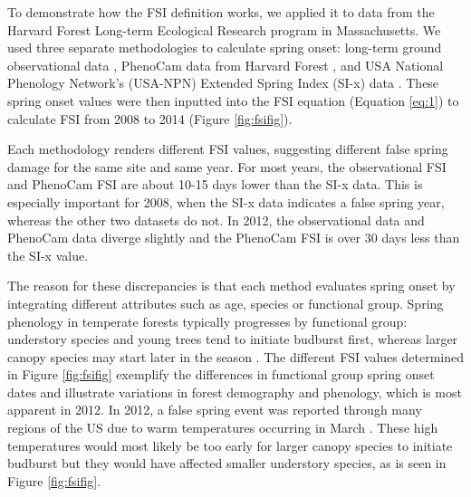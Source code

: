 \documentclass{article}\usepackage[]{graphicx}\usepackage[]{color}
\begin{document}
To demonstrate how the FSI definition works, we applied it to data from the Harvard Forest Long-term Ecological Research program in Massachusetts. We used three separate methodologies to calculate spring onset: long-term ground observational data \citep{Okeefe2014}, PhenoCam data from Harvard Forest \citep{Richardson2015}, and USA National Phenology Network's (USA-NPN) Extended Spring Index (SI-x) data \citep{USA-NPN2016}. These spring onset values were then inputted into the FSI equation (Equation \ref{eq:1}) to calculate FSI from 2008 to 2014 (Figure \ref{fig:fsifig}). 

Each methodology renders different FSI values, suggesting different false spring damage for the same site and same year. For most years, the observational FSI and PhenoCam FSI are about 10-15 days lower than the SI-x data. This is especially important for 2008, when the SI-x data indicates a false spring year, whereas the other two datasets do not. In 2012, the observational data and PhenoCam data diverge slightly and the PhenoCam FSI is over 30 days less than the SI-x value.

The reason for these discrepancies is that each method evaluates spring onset by integrating different attributes such as age, species or functional group. Spring phenology in temperate forests typically progresses by functional group: understory species and young trees tend to initiate budburst first, whereas larger canopy species may start later in the season \citep{Richardson2009, Xin2016}. The different FSI values determined in Figure \ref{fig:fsifig} exemplify the differences in functional group spring onset dates and illustrate variations in forest demography and phenology, which is most apparent in 2012. In 2012, a false spring event was reported through many regions of the US due to warm temperatures occurring in March \citep{Ault2015}. These high temperatures would most likely be too early for larger canopy species to initiate budburst but they would have affected smaller understory species, as is seen in Figure \ref{fig:fsifig}. 
\end{document}
